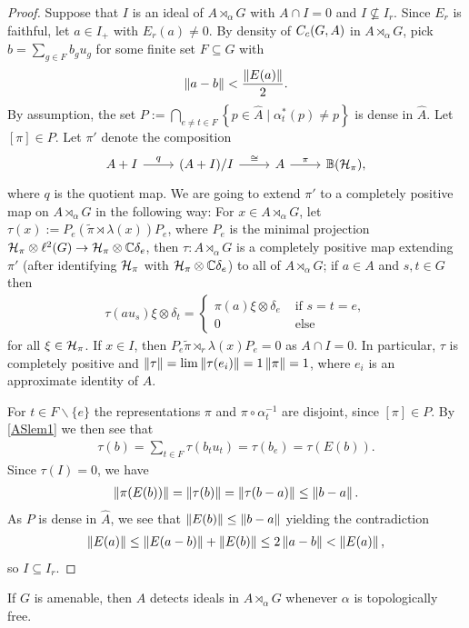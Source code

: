 \begin{proof}
	Suppose that $I$ is an ideal of $A \rtimes_\alpha G$ with $A \cap I=0$ and $I \not \subseteq I_r$. Since $E_r$ is faithful, let $a \in I_+$ with $E_r(a) \neq 0$. By density of $C_c(G,A)$ in $A \rtimes_\alpha G$, pick $b = \sum_{g \in F} b_g u_g$ for some finite set $F \subseteq G$ with
	\begin{align*}
		\left\lVert a - b \right\rVert < \frac{\left\lVert E (a) \right\rVert}{2}.
	\end{align*}
	By assumption, the set $P := \bigcap_{e \neq t \in F}\left\{ p \in \hat A \mid \alpha_{t}^*(p) \neq p \right\}$ is dense in $\hat A$. Let $[\pi] \in P$. Let $\pi'$ denote the composition
	\begin{equation*}
		\begin{tikzcd}
			A + I \ar[r, "q"] & (A+I)/I \ar[r, "\cong"] & A \ar[r, "\pi"]  & \mathbb{B}(\H_\pi),
		\end{tikzcd}
	\end{equation*}
	where $q$ is the quotient map. We are going to extend $\pi'$ to a completely positive map on $A \rtimes_\alpha G$ in the following way:	For $x \in A \rtimes_\alpha G$, let $\tau(x) := P _e(\tilde \pi \rtimes \lambda(x)) P_e$, where $P_e$ is the minimal projection $\mathcal{H}_\pi \otimes \ell^2(G) \to \mathcal{H}_\pi \otimes \mathbb{C} \delta_{e}$, then $\tau \colon A \rtimes_\alpha G$ is a completely positive map extending $\pi'$ (after identifying $\mathcal{H}_\pi$ with $\mathcal{H}_\pi \otimes \mathbb{C} \delta_e$) to all of $A \rtimes_\alpha G$; if $a \in A$ and $s,t \in G$ then
	\begin{align*}
		\tau(au_s) \xi \otimes \delta_t = \begin{cases}
			\pi(a) \xi \otimes \delta_e & \text{ if } s = t = e,\\
			0 & \text{ else}
		\end{cases}
	\end{align*}
	for all $\xi \in \mathcal{H}_\pi$. If $x \in I$, then $P_e \tilde \pi \rtimes_r \lambda (x) P_e = 0$ as $A \cap I = 0$. In particular, $\tau$ is completely positive and $\left\lVert \tau \right\rVert = \lim \left\lVert \tau(e_i)\right\rVert = 1\left\lVert \pi \right\rVert = 1$, where $e_i$ is an approximate identity of $A$. 
	
	For $t \in F\backslash\{e\}$ the representations $\pi$ and $\pi \circ \alpha_{t}^{-1}$ are disjoint, since $[\pi] \in P$. By \cref{ASlem1} we then see that
	\begin{align*}
		\tau(b) = \sum_{t \in F} \tau(b_t u_t) = \tau(b_e) = \tau(E(b)).
	\end{align*}
	Since $\tau(I) = 0$, we have
	\begin{align*}
		\left\lVert \pi(E(b))\right\rVert = \left\lVert \tau(b) \right\rVert = \left\lVert \tau(b-a)\right\rVert \leq \left\lVert b-a\right\rVert.
	\end{align*}
	As $P$ is dense in $\hat A$, we see that $\left\lVert E(b)\right\rVert \leq \left\lVert b-a\right\rVert$ yielding the contradiction
	\begin{align*}
		\left\lVert E(a) \right\rVert \leq \left\lVert E(a-b)\right\rVert + \left\lVert E(b)\right\rVert \leq 2 \left\lVert a-b\right\rVert <  \left\lVert E(a)\right\rVert,
	\end{align*}
	so $I \subseteq I_r$.
\end{proof}
\begin{corollary}
	If $G$ is amenable, then $A$ detects ideals in $A \rtimes_\alpha G$ whenever $\alpha$ is topologically free.
\end{corollary}

